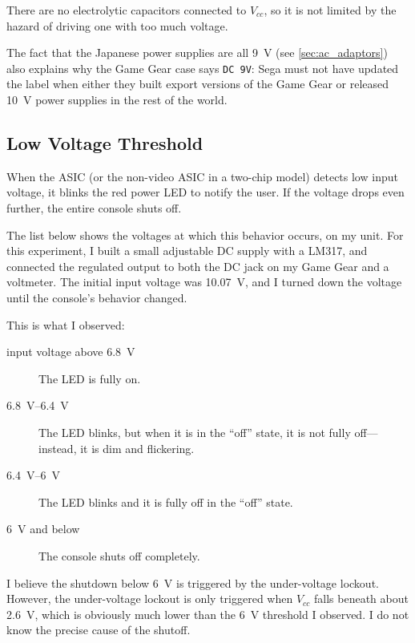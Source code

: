 \documentclass{article}
\newcommand{\Vcc}{$V_{cc}$}
\newcommand{\model}{\textsf}
\begin{document}
There are no electrolytic capacitors connected to \Vcc{}, so it is not
limited by the hazard of driving one with too much voltage.

The fact that the Japanese power supplies are all \qty{9}{\volt} (see
\ref{sec:ac_adaptors}) also explains why the Game Gear case says
\texttt{DC 9V}: Sega must not have updated the label when either they
built export versions of the Game Gear or released \qty{10}{\volt}
power supplies in the rest of the world.

\subsection{Low Voltage Threshold}
\label{sec:low_voltage}
When the ASIC (or the non-video ASIC in a two-chip model) detects low
input voltage, it blinks the red power LED to notify the user. If the
voltage drops even further, the entire console shuts off.

The list below shows the voltages at which this behavior occurs, on my
unit. For this experiment, I built a small adjustable DC supply with a
\model{LM317}, and connected the regulated output to both the DC jack
on my Game Gear and a voltmeter. The initial input voltage was
\qty{10.07}{\volt}, and I turned down the voltage until the console's
behavior changed.

This is what I observed:

\begin{description}
\item[input voltage above \qty{6.8}{\volt}] The LED is fully on.
\item[\qty{6.8}{\volt}--\qty{6.4}{\volt}] The LED blinks, but when it
  is in the ``off'' state, it is not fully off---instead, it is dim
  and flickering.
\item[\qty{6.4}{\volt}--\qty{6}{\volt}] The LED blinks and it is fully
  off in the ``off'' state.
\item[\qty{6}{\volt} and below] The console shuts off completely.
\end{description}

I believe the shutdown below \qty{6}{\volt} is triggered by the
under-voltage lockout. However, the under-voltage lockout is only
triggered when \Vcc{} falls beneath about \qty{2.6}{\volt}, which is
obviously much lower than the \qty{6}{\volt} threshold I observed. I
do not know the precise cause of the shutoff.

\end{document}
